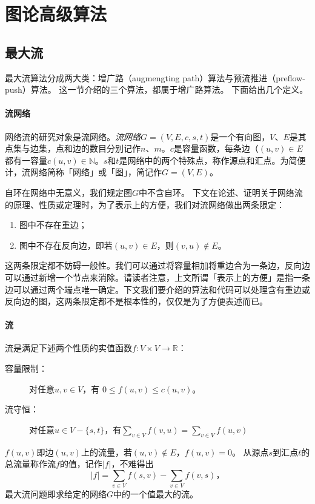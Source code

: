\documentclass[fontset=ubuntu]{ctexbook}
\begin{document}
    \chapter{图论高级算法}
    \section{最大流}
    最大流算法分成两大类：增广路（augmengting path）算法与预流推进（preflow-push）算法。
    这一节介绍的三个算法，都属于增广路算法。
    下面给出几个定义。
    \subsubsection*{流网络}
    网络流的研究对象是流网络。\emph{流网络}$G=(V,E,c,s,t)$是一个有向图，$V$、$E$是其点集与边集，点和边的数目分别记作$n$、$m$。$c$是容量函数，每条边（$(u,v)\in E$都有一容量$c(u,v)\in \mathbb{N}$。$s$和$t$是网络中的两个特殊点，称作源点和汇点。为简便计，流网络简称「网络」或「图」，简记作$G=(V,E)$。

    自环在网络中无意义，我们规定图$G$中不含自环。%
    下文在论述、证明关于网络流的原理、性质或定理时，为了表示上的方便，我们对流网络做出两条限定：
    \begin{enumerate}
        \item 图中不存在重边；\label{Restrict:1}
        \item 图中不存在反向边，即若$(u,v)\in E$，则$(v,u)\notin E$。\label{Restrict:2}
    \end{enumerate}
    这两条限定都不妨碍一般性。我们可以通过将容量相加将重边合为一条边，反向边可以通过新增一个节点来消除。请读者注意，上文所谓「表示上的方便」是指一条边可以通过两个端点唯一确定。下文我们要介绍的算法和代码可以处理含有重边或反向边的图，这两条限定都不是根本性的，仅仅是为了方便表述而已。

    \subsubsection*{流}
    流是满足下述两个性质的实值函数$f\colon V\times V\to\mathbb{R}$：
    \begin{description}
        \item[容量限制：]对任意$u,v \in V$，有 $0\le f(u,v)\le c(u,v)$。
        \item[流守恒：]对任意$u\in V-\{s,t\}$，有$\sum\limits_{v\in V}f(v,u)= \sum\limits_{v\in V}f(u,v)$
    \end{description}
    $f(u,v)$即边$(u,v)$上的流量，若$(u,v)\notin E$，$f(u,v) = 0$。
    从源点$s$到汇点$t$的总流量称作流$f$的值，记作$|f|$，不难得出
    $$|f| = \sum_{v\in V}f(s,v) - \sum_{v\in V}f(v,s)\text{，}$$
    最大流问题即求给定的网络$G$中的一个值最大的流。
\end{document}
